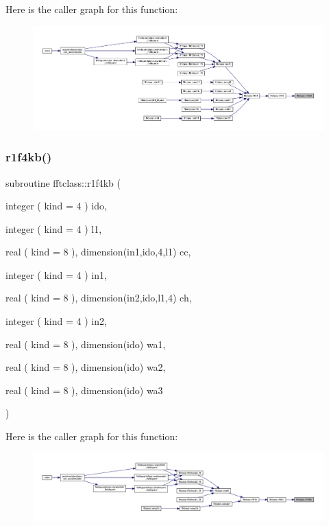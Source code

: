 Here is the caller graph for this function\+:\nopagebreak
\begin{figure}[H]
\begin{center}
\leavevmode
\includegraphics[width=350pt]{namespacefftclass_a382f39146e7d8e1450810efdc6f4cd79_icgraph}
\end{center}
\end{figure}
\mbox{\label{namespacefftclass_a71f9b9a5e0173f9ddef4dd0fc92e6164}} 
\subsubsection{\texorpdfstring{r1f4kb()}{r1f4kb()}}
{\footnotesize\ttfamily subroutine fftclass\+::r1f4kb (\begin{DoxyParamCaption}\item[{integer ( kind = 4 )}]{ido,  }\item[{integer ( kind = 4 )}]{l1,  }\item[{real ( kind = 8 ), dimension(in1,ido,4,l1)}]{cc,  }\item[{integer ( kind = 4 )}]{in1,  }\item[{real ( kind = 8 ), dimension(in2,ido,l1,4)}]{ch,  }\item[{integer ( kind = 4 )}]{in2,  }\item[{real ( kind = 8 ), dimension(ido)}]{wa1,  }\item[{real ( kind = 8 ), dimension(ido)}]{wa2,  }\item[{real ( kind = 8 ), dimension(ido)}]{wa3 }\end{DoxyParamCaption})}

Here is the caller graph for this function\+:\nopagebreak
\begin{figure}[H]
\begin{center}
\leavevmode
\includegraphics[width=350pt]{namespacefftclass_a71f9b9a5e0173f9ddef4dd0fc92e6164_icgraph}
\end{center}
\end{figure}
\mbox{\label{namespacefftclass_ac2e28efef69b7ac5c599c51dc9be973d}} 

